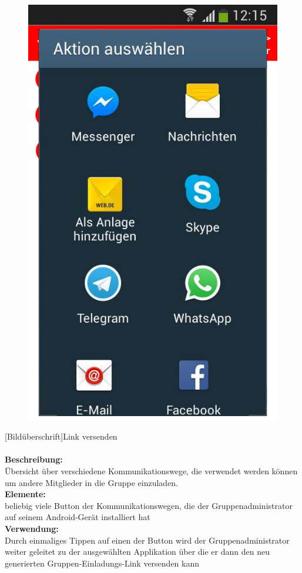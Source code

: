 \begin{figure}
	\includegraphics[scale =1]{resources/images/link_versenden.png}
\end{figure}
[Bildüberschrift]Link versenden\\ \\
\textbf{Beschreibung:}\\
Übersicht über verschiedene Kommunikationswege, die verwendet werden können um andere Mitglieder in die Gruppe einzuladen.\\
\textbf{Elemente:}\\
beliebig viele Button der Kommunikationswegen, die der Gruppenadministrator auf seinem Android-Gerät installiert hat\\
\textbf{Verwendung:}\\
Durch einmaliges Tippen auf einen der Button wird der Gruppenadministrator weiter geleitet zu der ausgewählten Applikation über die er dann den neu generierten Gruppen-Einladungs-Link versenden kann\\ \\

